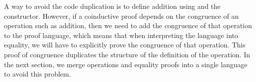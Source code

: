A way to avoid the code duplication is to define addition using
 and the  constructor.
However, if a coinductive proof depends on the congruence of an operation such
as addition, then we need to add the congruence of that operation to the proof
language, which means that when interpreting the language into equality, we will
have to explicitly prove the congruence of that operation. This proof of
congruence duplicates the structure of the definition of the operation. In the
next section, we merge operations and equality proofs into a single language to
avoid this problem.
